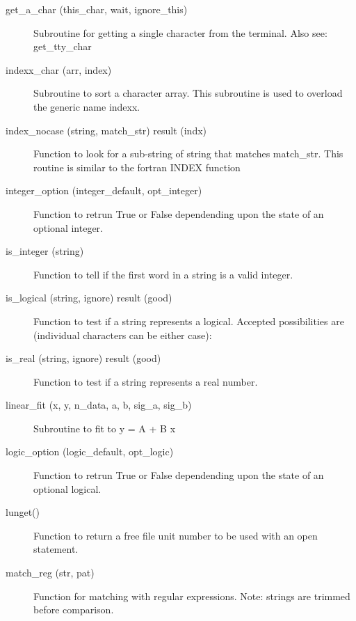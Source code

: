 \begin{description}
\item[get_a_char (this_char, wait, ignore_this)] \Newline 
Subroutine for getting a single character from the terminal.
Also see: get_tty_char

\item[indexx_char (arr, index)] \Newline 
Subroutine to sort a character array.
This subroutine is used to overload the generic name indexx.

\item[index_nocase (string, match_str) result (indx)] \Newline 
Function to look for a sub-string of string that matches match_str.
This routine is similar to the fortran INDEX function

\item[integer_option (integer_default, opt_integer)] \Newline 
Function to retrun True or False dependending upon the state of an 
optional integer.

\item[is_integer (string)] \Newline 
Function to tell if the first word in a string is a valid integer.

\item[is_logical (string, ignore) result (good)] \Newline 
Function to test if a string represents a logical.
Accepted possibilities are (individual characters can be either case):

\item[is_real (string, ignore) result (good)] \Newline 
Function to test if a string represents a real number.

\item[linear_fit (x, y, n_data, a, b, sig_a, sig_b)] \Newline 
Subroutine to fit to y = A + B x

\item[logic_option (logic_default, opt_logic)] \Newline 
Function to retrun True or False dependending upon the state of an 
optional logical.

\item[lunget()] \Newline 
Function to return a free file unit number to be used with an open statement.

\item[match_reg (str, pat)] \Newline 
Function for matching with regular expressions.
Note: strings are trimmed before comparison.


\end{description}
